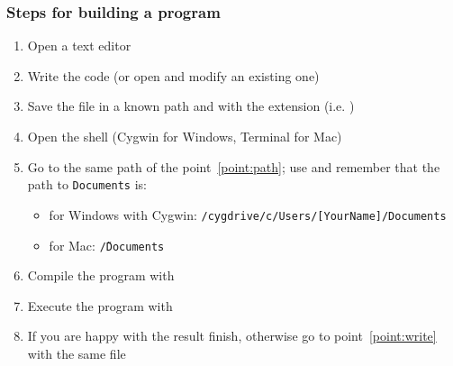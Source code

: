 \begin{frame}
  \frametitle{Steps for building a program}
  \begin{enumerate}
  \item Open a \alert{text editor}
  \item\label{point:write} \alert{Write} the code (or open and modify an existing one)
  \item\label{point:path} \alert{Save} the file in a known path and with the
    extension  (i.e. )
  \item Open the \alert{shell} (Cygwin for Windows, Terminal for Mac)
  \item Go to the same \alert{path} of the point~\ref{point:path}; use
     and remember that the path to \texttt{Documents} is:
    \begin{itemize}
    \item for Windows with Cygwin: \texttt{/cygdrive/c/Users/[YourName]/Documents}
    \item for Mac: \texttt{\~/Documents}
    \end{itemize}
  \item \alert{Compile} the program with 
  \item \alert{Execute} the program with 
  \item If you are happy with the result finish, otherwise go to
    point~\ref{point:write} with the same file
  \end{enumerate}
\end{frame}

